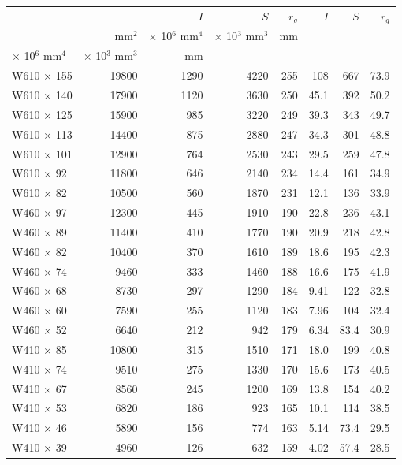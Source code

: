 \documentclass[a4paper,openany,12pt]{book}
\begin{document}
{{\begin{center}
\begin{tabular}{lrrrrrrr}
\toprule
 &  & \(I\) & \(S\) & \(r_g\) & \(I\) & \(S\) & \(r_g\)\\
 & mm\(^2\) & \(\times\) 10\(^6\) mm\(^4\) & \(\times\) 10\(^3\) mm\(^3\) & mm &  &  & \\
\(\times\) 10\(^6\) mm\(^4\) & \(\times\) 10\(^3\) mm\(^3\) & mm &  &  &  &  & \\
\midrule
W610 \(\times\) 155 & 19800 & 1290 & 4220 & 255 & 108 & 667 & 73.9\\
W610 \(\times\) 140 & 17900 & 1120 & 3630 & 250 & 45.1 & 392 & 50.2\\
W610 \(\times\) 125 & 15900 & 985 & 3220 & 249 & 39.3 & 343 & 49.7\\
W610 \(\times\) 113 & 14400 & 875 & 2880 & 247 & 34.3 & 301 & 48.8\\
W610 \(\times\) 101 & 12900 & 764 & 2530 & 243 & 29.5 & 259 & 47.8\\
W610 \(\times\) 92 & 11800 & 646 & 2140 & 234 & 14.4 & 161 & 34.9\\
W610 \(\times\) 82 & 10500 & 560 & 1870 & 231 & 12.1 & 136 & 33.9\\
W460 \(\times\) 97 & 12300 & 445 & 1910 & 190 & 22.8 & 236 & 43.1\\
W460 \(\times\) 89 & 11400 & 410 & 1770 & 190 & 20.9 & 218 & 42.8\\
W460 \(\times\) 82 & 10400 & 370 & 1610 & 189 & 18.6 & 195 & 42.3\\
W460 \(\times\) 74 & 9460 & 333 & 1460 & 188 & 16.6 & 175 & 41.9\\
W460 \(\times\) 68 & 8730 & 297 & 1290 & 184 & 9.41 & 122 & 32.8\\
W460 \(\times\) 60 & 7590 & 255 & 1120 & 183 & 7.96 & 104 & 32.4\\
W460 \(\times\) 52 & 6640 & 212 & 942 & 179 & 6.34 & 83.4 & 30.9\\
W410 \(\times\) 85 & 10800 & 315 & 1510 & 171 & 18.0 & 199 & 40.8\\
W410 \(\times\) 74 & 9510 & 275 & 1330 & 170 & 15.6 & 173 & 40.5\\
W410 \(\times\) 67 & 8560 & 245 & 1200 & 169 & 13.8 & 154 & 40.2\\
W410 \(\times\) 53 & 6820 & 186 & 923 & 165 & 10.1 & 114 & 38.5\\
W410 \(\times\) 46 & 5890 & 156 & 774 & 163 & 5.14 & 73.4 & 29.5\\
W410 \(\times\) 39 & 4960 & 126 & 632 & 159 & 4.02 & 57.4 & 28.5\\

\end{tabular}
\end{center}}}
\end{document}
